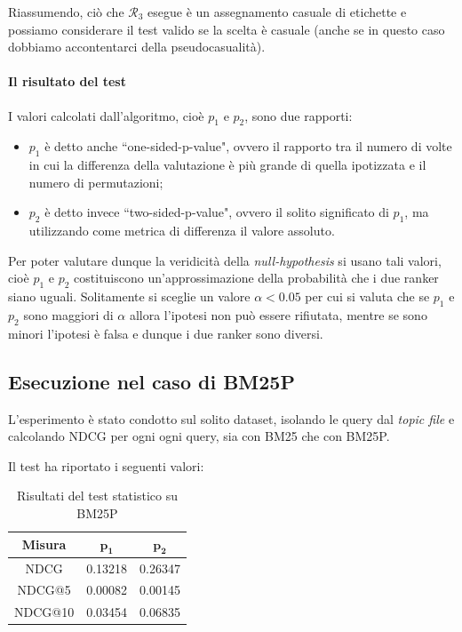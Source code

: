 Riassumendo, ciò che $\mathcal{R}_3$ esegue è un assegnamento casuale di etichette e
possiamo considerare il test valido se la scelta è casuale (anche se in questo caso
dobbiamo accontentarci della pseudocasualità).

\paragraph{Il risultato del test}
I valori calcolati dall'algoritmo, cioè $p_1$ e $p_2$, sono due rapporti:

\begin{itemize}
	\item $p_1$ è detto anche ``one-sided-p-value", ovvero il rapporto tra il numero di volte in cui la differenza
	della valutazione è più grande di quella ipotizzata e il numero di permutazioni;
	\item $p_2$ è detto invece ``two-sided-p-value", ovvero il solito significato di $p_1$, ma utilizzando
	come metrica di differenza il valore assoluto.
\end{itemize}


Per poter valutare dunque la veridicità della \textit{null-hypothesis} si usano tali valori,
cioè $p_1$ e $p_2$ costituiscono un'approssimazione della probabilità che i due ranker
siano uguali. Solitamente si sceglie un valore $\alpha < 0.05$ per cui si valuta che
se $p_1$ e $p_2$ sono maggiori di $\alpha$ allora l'ipotesi non può essere rifiutata,
mentre se sono minori l'ipotesi è falsa e dunque i due ranker sono diversi.

\pagebreak

\subsection{Esecuzione nel caso di BM25P}
L'esperimento è stato condotto sul solito dataset, isolando le query dal\textit{ topic file} e calcolando NDCG
per ogni ogni query, sia con BM25 che con BM25P.

Il test ha riportato i seguenti valori:

\begin{table}[h!]
	\centering
	\begin{tabular}{|c|c|c|}
		\hline
		\textbf{Misura} & $\mathbf{p_1}$ & $\mathbf{p_2}$ \\
		\hline
		NDCG  & 0.13218 & 0.26347 \\
		\hline
		NDCG@5 & 0.00082 & 0.00145 \\
		\hline
		NDCG@10 & 0.03454 & 0.06835 \\
		\hline
	\end{tabular}
	\caption{Risultati del test statistico su BM25P}
\end{table}

